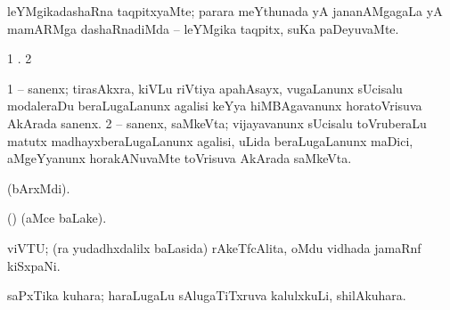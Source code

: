 \bentry
{} 
\gl{\kirxvi}
\expl{}
\bmng
 leYMgikadashaRna taqpitxyaMte; parara meYthunada yA jananAMgagaLa yA mamARMga dashaRnadiMda -- leYMgika taqpitx, suKa paDeyuvaMte. 
\emng
\eentry

\bentry
{}
\gl{\saMkiSx}
\expl{}
\bmng
\emng
\eentry

\bentry
{}
\gl{\saMkiSx}
\expl{\Latin }
\bmng
\bnum
\num{1}  . 
\num{2}  
\enum
\emng
\eentry

\bentry 
{}
\gl{\saMkiSx}
\expl{}
\bmng
\emng
\eentry

\bentry
{}
\gl{\saMkiSx}
\expl{}
\bmng
\emng
\eentry


\bentry
{} 
\gl{\nA}
\expl{}
\bmng
\bnum
\num{1}  -- sanenx; tirasAkxra, kiVLu riVtiya apahAsayx, \mo vugaLanunx sUcisalu modaleraDu beraLugaLanunx agalisi keYya hiMBAgavanunx horatoVrisuva  AkArada sanenx. 
\num{2}  -- sanenx, saMkeVta; vijayavanunx sUcisalu toVruberaLu matutx madhayxberaLugaLanunx agalisi, uLida beraLugaLanunx maDici, aMgeYyanunx horakANuvaMte toVrisuva  AkArada saMkeVta. 
\enum
\emng
\eentry

\bentry
{}
\gl{\saMkiSx}
\expl{}
\bmng
\emng
\eentry

\bentry
{} 
\gl{\saMkiSx}
\expl{}
\bmng
  (bArxMdi). 
\emng
\eentry

\bentry 
{}
\gl{\saMkiSx}
\expl{}
\bmng
 (\ame)  (aMce baLake). 
\emng
\eentry

\bentry
{}
\gl{\saMkiSx}
\expl{}
\bmng
\emng
\eentry

\bentry
{}
\gl{\saMkiSx}
\expl{}
\bmng
\emng
\eentry

\bentry
{} 
\gl{\saMkiSx}
\expl{}
\bmng
\emng
\eentry

\bentry
{} 
\gl{\nA}
\expl{}
\bmng
 viVTU; (ra yudadhxdalilx baLasida) rAkeTfcAlita, oMdu vidhada jamaRnf kiSxpaNi. 
\emng
\eentry

\bentry
{} 
\gl{\nA}
\expl{}
\bmng
 saPxTika kuhara; haraLugaLu sAlugaTiTxruva kalulxkuLi, shilAkuhara. 
\emng
\eentry

